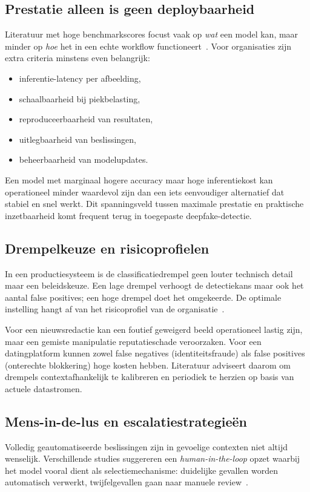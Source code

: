 \subsection{Prestatie alleen is geen deploybaarheid}
Literatuur met hoge benchmarkscores focust vaak op \emph{wat} een model kan, maar minder op \emph{hoe} het in een echte workflow functioneert~\autocite{Raza2026,EvaluationModels2025}. Voor organisaties zijn extra criteria minstens even belangrijk:
\begin{itemize}
  \item inferentie-latency per afbeelding,
  \item schaalbaarheid bij piekbelasting,
  \item reproduceerbaarheid van resultaten,
  \item uitlegbaarheid van beslissingen,
  \item beheerbaarheid van modelupdates.
\end{itemize}

Een model met marginaal hogere accuracy maar hoge inferentiekost kan operationeel minder waardevol zijn dan een iets eenvoudiger alternatief dat stabiel en snel werkt. Dit spanningsveld tussen maximale prestatie en praktische inzetbaarheid komt frequent terug in toegepaste deepfake-detectie.

\subsection{Drempelkeuze en risicoprofielen}
In een productiesysteem is de classificatiedrempel geen louter technisch detail maar een beleidskeuze. Een lage drempel verhoogt de detectiekans maar ook het aantal false positives; een hoge drempel doet het omgekeerde. De optimale instelling hangt af van het risicoprofiel van de organisatie~\autocite{EvaluationModels2025}. 

Voor een nieuwsredactie kan een foutief geweigerd beeld operationeel lastig zijn, maar een gemiste manipulatie reputatieschade veroorzaken. Voor een datingplatform kunnen zowel false negatives (identiteitsfraude) als false positives (onterechte blokkering) hoge kosten hebben. Literatuur adviseert daarom om drempels contextafhankelijk te kalibreren en periodiek te herzien op basis van actuele datastromen.

\subsection{Mens-in-de-lus en escalatiestrategieën}
Volledig geautomatiseerde beslissingen zijn in gevoelige contexten niet altijd wenselijk. Verschillende studies suggereren een \emph{human-in-the-loop} opzet waarbij het model vooral dient als selectiemechanisme: duidelijke gevallen worden automatisch verwerkt, twijfelgevallen gaan naar manuele review~\autocite{SIDA2025,MultimodalSurvey2025}. 

